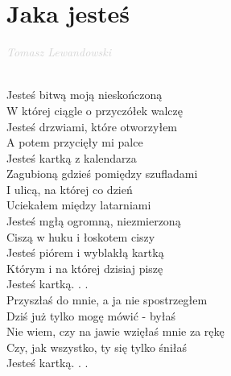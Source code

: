 \documentclass[a5paper, 10pt]{book}
\begin{document}
\newpage
\section{Jaka jesteś}\textcolor{lightgray}{\textit{Tomasz Lewandowski}}\\~\\
\begin{minipage}[t]{0.7\textwidth}
Jesteś bitwą moją nieskończoną\\
W której ciągle o przyczółek walczę\\
Jesteś drzwiami, które otworzyłem\\
A potem przycięły mi palce\\

\hspace*{2mm} Jesteś kartką z kalendarza\\
\hspace*{2mm} Zagubioną gdzieś pomiędzy szufladami\\
\hspace*{2mm} I ulicą, na której co dzień\\
\hspace*{2mm} Uciekałem między latarniami\\

Jesteś mgłą ogromną, niezmierzoną\\
Ciszą w huku i łoskotem ciszy\\
Jesteś piórem i wyblakłą kartką\\
Którym i na której dzisiaj piszę\\

\hspace*{2mm} Jesteś kartką. . .\\

Przyszłaś do mnie, a ja nie spostrzegłem\\
Dziś już tylko mogę mówić - byłaś\\
Nie wiem, czy na jawie wzięłaś mnie za rękę\\
Czy, jak wszystko, ty się tylko śniłaś\\

\hspace*{2mm} Jesteś kartką. . .\\

\end{minipage}
\end{document}
